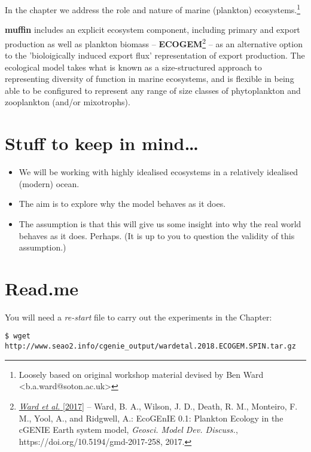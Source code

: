 \documentclass[11pt,fleqn]{book} %
\begin{document}
\hfill \break

\noindent In the chapter we address the role and nature of marine (plankton) ecosystems.\footnote{Loosely based on original workshop material  devised by Ben Ward <b.a.ward@soton.ac.uk>}

\textbf{muffin} includes an explicit ecosystem component, including primary and export production as well as plankton biomass -- \textbf{ECOGEM}\footnote{\href{https://doi.org/10.5194/gmd-2017-258}{\textit{Ward et al.} [2017]} -- Ward, B. A., Wilson, J. D., Death, R. M., Monteiro, F. M., Yool, A., and Ridgwell, A.: EcoGEnIE 0.1: Plankton Ecology in the cGENIE Earth system model, \textit{Geosci. Model Dev. Discuss.}, https://doi.org/10.5194/gmd-2017-258, 2017.} -- as an alternative option to the 'bioloigically induced export flux' representation of export production. The ecological model takes what is known as a size-structured approach to representing diversity of function in marine ecosystems, and is flexible in being able to be configured to represent any range of size classes of phytoplankton and zooplankton (and/or mixotrophs).

\section*{Stuff to keep in mind\dots}
\begin{itemize}
\item We will be working with highly idealised ecosystems in a relatively idealised (modern) ocean.
\item The aim is to explore why the model behaves as it does.
\item The assumption is that this will give us some insight into why the real world behaves as it does. Perhaps. (It is up to you to question the validity of this assumption.)
\end{itemize}


\newpage


\section*{Read.me}

\vspace{2mm}
You will need a \textit{re-start} file to carry out the experiments in the Chapter:
\small \begin{verbatim}
$ wget http://www.seao2.info/cgenie_output/wardetal.2018.ECOGEM.SPIN.tar.gz
\end{verbatim} \normalsize
\end{document}
